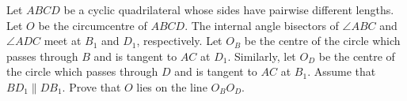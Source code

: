 Let $ABCD$ be a cyclic quadrilateral whose sides have pairwise different lengths. Let $O$ be the circumcentre of $ABCD$. The internal angle bisectors of $\angle ABC$ and $\angle ADC$ meet at $B_1$ and $D_1$, respectively. Let $O_B$ be the centre of the circle which passes through $B$ and is tangent to $AC$ at $D_1$. Similarly, let $O_D$ be the centre of the circle which passes through $D$ and is tangent to $AC$ at $B_1$. Assume that $BD_1 \parallel DB_1$. Prove that $O$ lies on the line $O_BO_D$.
